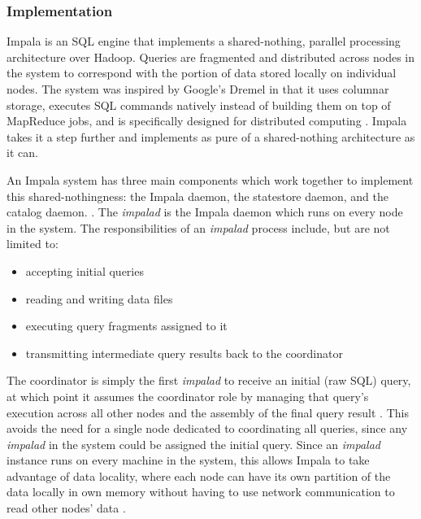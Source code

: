 \documentclass[onecolumn, draftclsnofoot,10pt, compsoc]{IEEEtran}
\begin{document}
\subsubsection{Implementation}
Impala is an SQL engine that implements a shared-nothing, parallel processing architecture over Hadoop.
Queries are fragmented and distributed across nodes in the system to correspond with the portion of data stored locally on individual nodes.
The system was inspired by Google’s Dremel in that it uses columnar storage, executes SQL commands natively instead of building them on top of MapReduce jobs, and is specifically designed for distributed computing \cite{SQLonHadoop} \cite{Dremel}.
Impala takes it a step further and implements as pure of a shared-nothing architecture as it can.

An Impala system has three main components which work together to implement this shared-nothingness: the Impala daemon, the statestore daemon, and the catalog daemon. \cite{ImpalaGuide}. 
The \textit{impalad} is the Impala daemon which runs on every node in the system.
The responsibilities of an \textit{impalad} process include, but are not limited to: \cite{Impala} \cite{ImpalaGuide}
\begin{itemize}
    \item accepting initial queries
    \item reading and writing data files
    \item executing query fragments assigned to it
    \item transmitting intermediate query results back to the coordinator
\end{itemize} 
The coordinator is simply the first \textit{impalad} to receive an initial (raw SQL) query, at which point it assumes the coordinator role by managing that query’s execution across all other nodes and the assembly of the final query result \cite{Impala}. 
This avoids the need for a single node dedicated to coordinating all queries, since any \textit{impalad} in the system could be assigned the initial query.
Since an \textit{impalad} instance runs on every machine in the system, this allows Impala to take advantage of data locality, where each node can have its own partition of the data locally in own memory without having to use network communication to read other nodes’ data \cite{Impala}.
\end{document}

